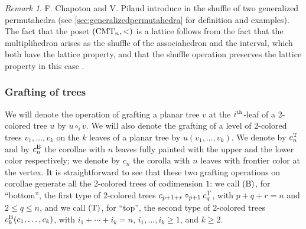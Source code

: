 \documentclass[twoside, 12pt]{amsart}
\theoremstyle{remark}
\newtheorem{remark}[definition]{\sc Remark}
\begin{document}
\begin{remark}
F. Chapoton and V. Pilaud introduce in \cite{CP22} the shuffle of two generalized permutahedra (see \cref{sec:generalizedpermutahedra} for definition and examples).
The fact that the poset $(\mathrm{CMT}_{n}, <)$ is a lattice follows from the fact that the multiplihedron arises as the shuffle of the associahedron and the interval, which both have the lattice property, and that the shuffle operation preserves the lattice property in this case \cite[Corollary 95]{CP22}. 
\end{remark}

\subsubsection{Grafting of trees} \label{sss:grafting}

We will denote the operation of grafting a planar tree $v$ at the $i^{\rm th}$-leaf of a 2-colored tree $u$ by $u \circ_i v$. 
We will also denote the grafting of a level of 2-colored trees $v_1, \ldots, v_k$ on the $k$ leaves of a planar tree by $u(v_1, \ldots, v_k)$. 
We denote by $c^{\mathrm{T}}_n$ and by $c^{\mathrm{B}}_n$ the corollae with $n$ leaves fully painted with the upper and the lower color respectively; we denote by $c_n$ the corolla with $n$ leaves with frontier color at the vertex. 
It is straightforward to see that these two grafting operations on corollae generate all the 2-colored trees of codimension $1$: we call $(\mathrm{B})$, for ``bottom'', the first type of 2-colored trees $c_{p+1+r}\circ_{p+1} c^{\mathrm{T}}_q$, with $p+q+r=n$ and $2\leq q\leq n$, and we call  $(\mathrm{T})$, for ``top'', the second type of 2-colored trees $c^{\mathrm{B}}_k(c_1, \ldots, c_k)$, with $i_1+\cdots+i_k=n$, $i_1, \ldots,i_k\geq 1$, and $k\geq 2$.
\end{document}
